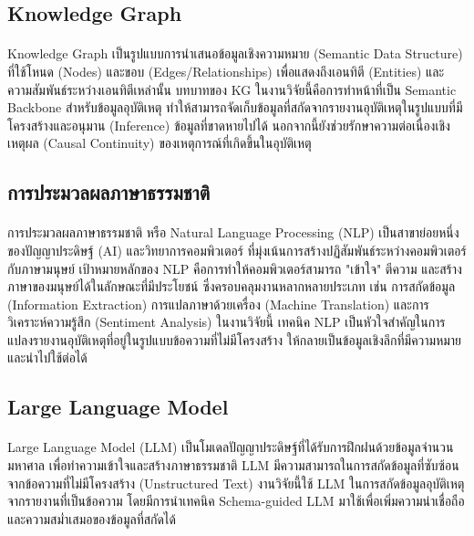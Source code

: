 \subsection{Knowledge Graph}\label{sec:KG}
\paragraph{}
Knowledge Graph เป็นรูปแบบการนำเสนอข้อมูลเชิงความหมาย (Semantic Data Structure) ที่ใช้โหนด (Nodes) และขอบ (Edges/Relationships) เพื่อแสดงถึงเอนทิตี (Entities) และความสัมพันธ์ระหว่างเอนทิตีเหล่านั้น บทบาทของ KG ในงานวิจัยนี้คือการทำหน้าที่เป็น Semantic Backbone สำหรับข้อมูลอุบัติเหตุ ทำให้สามารถจัดเก็บข้อมูลที่สกัดจากรายงานอุบัติเหตุในรูปแบบที่มีโครงสร้างและอนุมาน (Inference) ข้อมูลที่ขาดหายไปได้ นอกจากนี้ยังช่วยรักษาความต่อเนื่องเชิงเหตุผล (Causal Continuity) ของเหตุการณ์ที่เกิดขึ้นในอุบัติเหตุ

\subsection{การประมวลผลภาษาธรรมชาติ}\label{sec:NLP}
\paragraph{}
การประมวลผลภาษาธรรมชาติ หรือ Natural Language Processing (NLP) เป็นสาขาย่อยหนึ่งของปัญญาประดิษฐ์ (AI) และวิทยาการคอมพิวเตอร์ ที่มุ่งเน้นการสร้างปฏิสัมพันธ์ระหว่างคอมพิวเตอร์กับภาษามนุษย์ เป้าหมายหลักของ NLP คือการทำให้คอมพิวเตอร์สามารถ "เข้าใจ" ตีความ และสร้างภาษาของมนุษย์ได้ในลักษณะที่มีประโยชน์ ซึ่งครอบคลุมงานหลากหลายประเภท เช่น การสกัดข้อมูล (Information Extraction) การแปลภาษาด้วยเครื่อง (Machine Translation) และการวิเคราะห์ความรู้สึก (Sentiment Analysis) ในงานวิจัยนี้ เทคนิค NLP เป็นหัวใจสำคัญในการแปลงรายงานอุบัติเหตุที่อยู่ในรูปแบบข้อความที่ไม่มีโครงสร้าง ให้กลายเป็นข้อมูลเชิงลึกที่มีความหมายและนำไปใช้ต่อได้

\subsection{Large Language Model}
\paragraph{}
Large Language Model (LLM) เป็นโมเดลปัญญาประดิษฐ์ที่ได้รับการฝึกฝนด้วยข้อมูลจำนวนมหาศาล เพื่อทำความเข้าใจและสร้างภาษาธรรมชาติ LLM มีความสามารถในการสกัดข้อมูลที่ซับซ้อนจากข้อความที่ไม่มีโครงสร้าง (Unstructured Text) งานวิจัยนี้ใช้ LLM ในการสกัดข้อมูลอุบัติเหตุจากรายงานที่เป็นข้อความ โดยมีการนำเทคนิค Schema-guided LLM มาใช้เพื่อเพิ่มความน่าเชื่อถือและความสม่ำเสมอของข้อมูลที่สกัดได้

